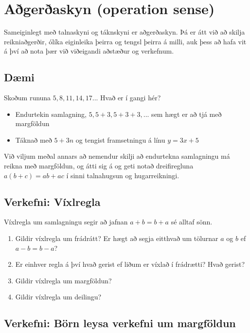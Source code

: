 \documentclass[
  icelandic,
]{book}
\providecommand{\tightlist}{%
  \setlength{\itemsep}{0pt}\setlength{\parskip}{0pt}}
\begin{document}
\section{Aðgerðaskyn (operation sense)}\label{adgerda-skyn}

Sameiginlegt með talnaskyni og táknskyni er aðgerðaskyn. Þá er átt við að skilja reikniaðgerðir, ólíka eiginleika þeirra og tengsl þeirra á milli, auk þess að hafa vit á því að nota þær við viðeigandi aðstæður og verkefnum.

\subsection{Dæmi}\label{daemi-adgerdaskyn}

Skoðum rununa \(5, 8, 11, 14, 17...\) Hvað er í gangi hér?

\begin{itemize}
\tightlist
\item
  Endurtekin samlagning, \(5, 5+3, 5+3+3, ...\) sem hægt er að tjá með margföldun
\item
  Táknað með \(5 + 3n\) og tengist framsetningu á línu \(y = 3x+5\)
\end{itemize}

Við viljum meðal annars að nemendur skilji að endurtekna samlagningu má reikna með margföldun, og átti sig á og geti notað dreifiregluna \(a(b+c)=ab+ac\) í sinni talnahugsun og hugarreikningi.

\subsection{Verkefni: Víxlregla}\label{verkefni-vixlregla}

Víxlregla um samlagningu segir að jafnan \(a+b = b+a\) sé alltaf sönn.

\begin{enumerate}
\def\labelenumi{\arabic{enumi}.}
\tightlist
\item
  Gildir víxlregla um frádrátt? Er hægt að segja eitthvað um tölurnar \(a\) og \(b\) ef \(a-b = b-a\)?
\item
  Er einhver regla á því hvað gerist ef liðum er víxlað í frádrætti? Hvað gerist?
\item
  Gildir víxlregla um margföldun?
\item
  Gildir víxlregla um deilingu?
\end{enumerate}

\subsection{Verkefni: Börn leysa verkefni um margföldun}\label{verkefni-myndband-talnaskyn}
\end{document}
